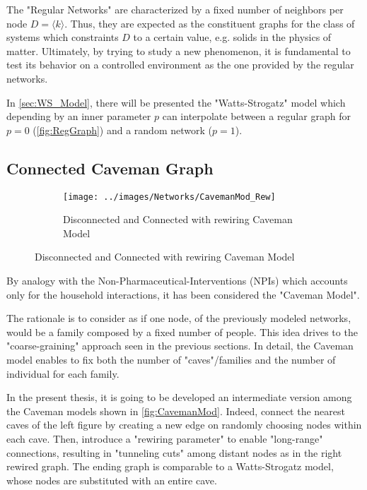 \documentclass[a4paper,10pt,twoside]{book} %
\theoremstyle{definition}
\begin{document}
The "Regular Networks" are characterized by a fixed number of neighbors per node $D = \langle k \rangle$. Thus, they are expected as the constituent graphs for the class of systems which constraints $D$ to a certain value, e.g. solids in the physics of matter.
Ultimately, by trying to study a new phenomenon, it is fundamental to test its behavior on a controlled environment as the one provided by the regular networks.

In \autoref{sec:WS_Model}, there will be presented the "Watts-Strogatz" model which depending by an inner parameter $p$ can interpolate between a regular graph for $p = 0$ (\autoref{fig:RegGraph}) and a random network ($p=1$).

\subsection{Connected Caveman Graph}
\begin{figure}[ht]
    \begin{subfigure}{\textwidth}
        \texttt{[image: ../images/Networks/CavemanMod\_Rew]}
        \centering
        \caption{Disconnected and Connected with rewiring Caveman Model \cite{Taube:2005_IndianSoftwIndustry}}
        \label{fig:CavemanMod}
    \end{subfigure}
\end{figure}

By analogy with the Non-Pharmaceutical-Interventions (NPIs) which accounts only for the household interactions, it has been considered the "Caveman Model".

The rationale is to consider as if one node, of the previously modeled networks, would be a family composed by a fixed number of people. This idea drives to the "coarse-graining" approach seen in the previous sections.
In detail, the Caveman model enables to fix both the number of "caves"/families and the number of individual for each family. 

In the present thesis, it is going to be developed an intermediate version among the Caveman models shown in \autoref{fig:CavemanMod}. Indeed, connect the nearest caves of the left figure by creating a new edge on randomly choosing nodes within each cave. Then, introduce a "rewiring parameter" to enable "long-range" connections, resulting in "tunneling cuts" among distant nodes as in the right rewired graph. The ending graph is comparable to a Watts-Strogatz model, whose nodes are substituted with an entire cave.
\end{document}
